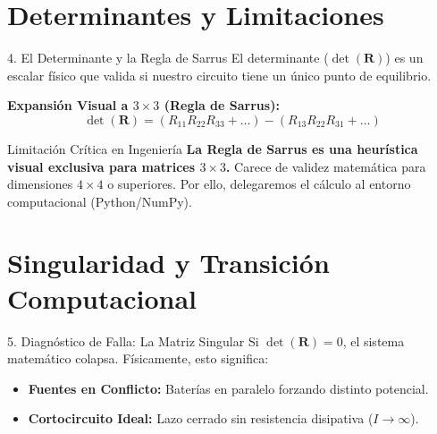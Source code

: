 \documentclass[aspectratio=169]{beamer}
\begin{document}
\section{Determinantes y Limitaciones}

\begin{frame}{4. El Determinante y la Regla de Sarrus}
    El determinante ($\det(\mathbf{R})$) es un escalar físico que valida si nuestro circuito tiene un único punto de equilibrio.
    
    \vspace{0.3cm}
    \textbf{Expansión Visual a $3\times3$ (Regla de Sarrus):}
    \begin{equation*}
        \det(\mathbf{R}) = (R_{11}R_{22}R_{33} + \dots) - (R_{13}R_{22}R_{31} + \dots)
    \end{equation*}
    
    \begin{alertblock}{Limitación Crítica en Ingeniería}
        \textbf{La Regla de Sarrus es una heurística visual exclusiva para matrices $3\times3$.} Carece de validez matemática para dimensiones $4\times4$ o superiores. Por ello, delegaremos el cálculo al entorno computacional (Python/NumPy).
    \end{alertblock}
\end{frame}

\section{Singularidad y Transición Computacional}

\begin{frame}{5. Diagnóstico de Falla: La Matriz Singular}
    Si $\det(\mathbf{R}) = 0$, el sistema matemático colapsa. Físicamente, esto significa:
    \begin{itemize}
        \item \textbf{Fuentes en Conflicto:} Baterías en paralelo forzando distinto potencial.
        \item \textbf{Cortocircuito Ideal:} Lazo cerrado sin resistencia disipativa ($I \to \infty$).
    \end{itemize}
\end{frame}
\end{document}

